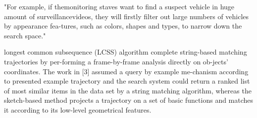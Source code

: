 
"For example, if themonitoring staves want to find a suspect vehicle in huge amount of surveillancevideos, they will firstly filter out large numbers of vehicles by appearance fea-tures, such as colors, shapes and types, to narrow down the search space."


longest   common   subsequence   (LCSS)   algorithm complete  string-based  matching  trajectories  by  per-forming  a  frame-by-frame  analysis  directly  on  ob-jects’ coordinates. The  work  in  [3]  assumed a  query  by  example  me-chanism  according  to  presented  example  trajectory and  the  search  system  could  return  a  ranked  list  of most similar items in the data set by a string matching algorithm,  whereas  the  sketch-based  method  projects a trajectory on a  set of basic functions and matches it according to its low-level geometrical features.